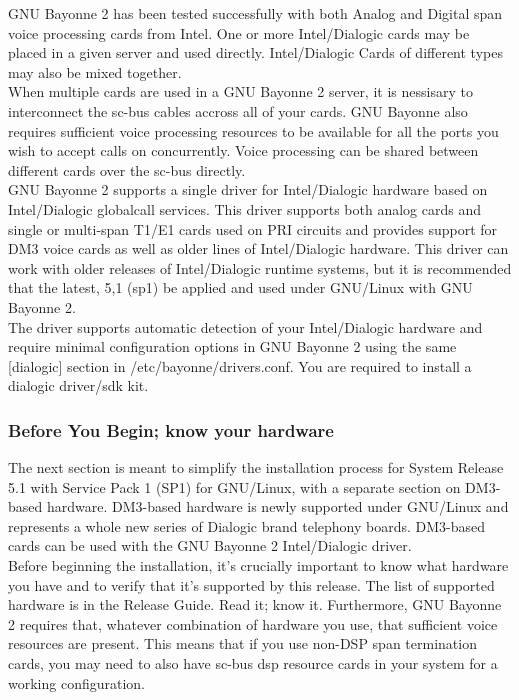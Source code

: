 \documentclass[a4paper,12pt]{article}
\begin{document}
GNU Bayonne 2 has been tested successfully with both Analog and Digital span
voice processing cards from Intel.  One or more Intel/Dialogic cards may
be placed in a given server and used directly.  Intel/Dialogic Cards of
different types may also be mixed together. \\

When multiple cards are used in a GNU Bayonne 2 server, it is nessisary to
interconnect the sc-bus cables accross all of your cards.  GNU Bayonne
also requires sufficient voice processing resources to be available for
all the ports you wish to accept calls on concurrently.  Voice processing
can be shared between different cards over the sc-bus directly. \\

GNU Bayonne 2 supports a single driver for Intel/Dialogic hardware based
on Intel/Dialogic globalcall services.  This driver supports both analog
cards and single or multi-span T1/E1 cards used on PRI circuits and
provides support for DM3 voice cards as well as older lines of
Intel/Dialogic hardware.  This driver can work with older releases of
Intel/Dialogic runtime systems, but it is recommended that the latest,
5,1 (sp1) be applied and used under GNU/Linux with GNU Bayonne 2. \\

The driver supports automatic detection of your Intel/Dialogic hardware
and require minimal configuration options in GNU Bayonne 2 using the
same [dialogic] section in /etc/bayonne/drivers.conf.  You are required
to install a dialogic driver/sdk kit. \\

\subsubsection{Before You Begin; know your hardware}

The next section is meant to simplify the installation process for
System Release 5.1 with Service Pack 1 (SP1) for GNU/Linux, with a
separate section on DM3-based hardware. DM3-based hardware is newly
supported under GNU/Linux and represents a whole new series of Dialogic
brand telephony boards.  DM3-based cards can be used with the GNU
Bayonne 2 Intel/Dialogic driver. \\

Before beginning the installation, it's crucially important to know what
hardware you have and to verify that it's supported by this release. 
The list of supported hardware is in the Release Guide. Read it; know
it. Furthermore, GNU Bayonne 2 requires that, whatever combination of
hardware you use, that sufficient voice resources are present.  This
means that if you use non-DSP span termination cards, you may need to
also have sc-bus dsp resource cards in your system for a working
configuration. \\
\end{document}

